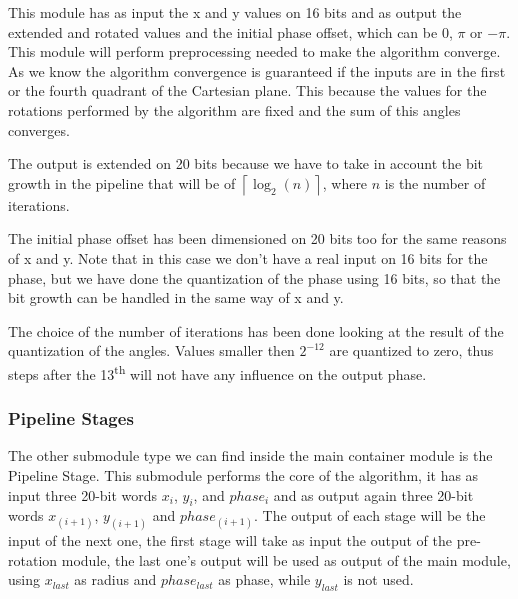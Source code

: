 This module has as input the x and y values on 16 bits and as output the
extended and rotated values and the initial phase offset, which can be \(0\),
\(\pi\) or \(-\pi\). This module will perform preprocessing needed to make the
algorithm converge. As we know the \cordic{} algorithm convergence is guaranteed
if the inputs are in the first or the fourth quadrant of the Cartesian plane.
This because the values for the rotations performed by the algorithm are fixed
and the sum of this angles converges.

The output is extended on 20 bits because we have to take in account the bit
growth in the pipeline that will be of \(\left\lceil{\log_2(n)}\right\rceil\),
where \(n\) is the number of iterations.

The initial phase offset has been dimensioned on 20 bits too for the same
reasons of x and y. Note that in this case we don't have a real input on 16 bits
for the phase, but we have done the quantization of the phase using 16 bits, so
that the bit growth can be handled in the same way of x and y.

The choice of the number of iterations has been done looking at the result of
the quantization of the angles. Values smaller then \(2^{-12}\) are quantized to
zero, thus steps after the 13\textsuperscript{th} will not have any influence on
the output phase.

\subsubsection{Pipeline Stages}

The other submodule type we can find inside the main container module is the
Pipeline Stage. This submodule performs the core of the \cordic{} algorithm, it
has as input three 20-bit words \(x_i\), \(y_i\), and \(phase_i\) and as output
again three 20-bit words \(x_{(i+1)}\), \(y_{(i+1)}\) and \(phase_{(i+1)}\). The
output of each stage will be the input of the next one, the first stage will
take as input the output of the pre-rotation module, the last one's output will
be used as output of the main module, using \(x_{last}\) as radius and
\(phase_{last}\) as phase, while \(y_{last}\) is not used.
